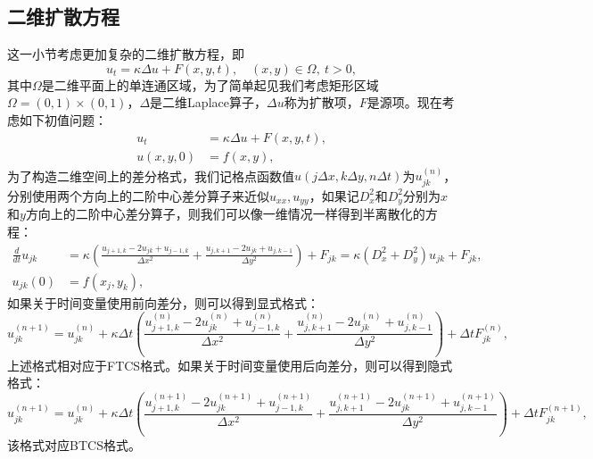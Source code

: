 \documentclass[a4paper,10pt]{ctexart}
\begin{document}
\subsection{二维扩散方程}
这一小节考虑更加复杂的二维扩散方程，即
\begin{equation}
    u_t = \kappa \Delta u + F(x,y,t),\quad (x,y)\in \Omega,\ t>0,
\end{equation}
其中$ \Omega $是二维平面上的单连通区域，为了简单起见我们考虑矩形区域$ \Omega = (0,1)\times (0,1) $，$ \Delta $是二维Laplace算子，$ \Delta u $称为扩散项，$ F $是源项。现在考虑如下初值问题：
\begin{equation}
    \begin{aligned}
        u_t &= \kappa \Delta u + F(x,y,t),\\
        u(x,y,0) &= f(x,y),
    \end{aligned}
\end{equation}
为了构造二维空间上的差分格式，我们记格点函数值$ u(j \Delta x, k \Delta y, n \Delta t) $为$ u^{(n)}_{jk} $，分别使用两个方向上的二阶中心差分算子来近似$ u_{xx}, u_{yy} $，如果记$ D_x^2 $和$ D_y^2 $分别为$ x $和$ y $方向上的二阶中心差分算子，则我们可以像一维情况一样得到半离散化的方程：
\begin{equation}
    \begin{aligned}
        \frac{d}{dt}u_{jk} &= \kappa \left( \frac{u_{j+1,k}-2u_{jk}+u_{j-1,k}}{\Delta x^2} + \frac{u_{j,k+1}-2u_{jk}+u_{j,k-1}}{\Delta y^2} \right) + F_{jk} = \kappa(D_x^2+D_y^2)u_{jk}+F_{jk},\\
        u_{jk}(0) &= f(x_j,y_k),
    \end{aligned}
\end{equation}
如果关于时间变量使用前向差分，则可以得到显式格式：
\begin{equation}
    u^{(n+1)}_{jk} = u^{(n)}_{jk} + \kappa \Delta t \left( \frac{u^{(n)}_{j+1,k}-2u^{(n)}_{jk}+u^{(n)}_{j-1,k}}{\Delta x^2} + \frac{u^{(n)}_{j,k+1}-2u^{(n)}_{jk}+u^{(n)}_{j,k-1}}{\Delta y^2} \right) + \Delta t F_{jk}^{(n)},
\end{equation}
上述格式相对应于FTCS格式。如果关于时间变量使用后向差分，则可以得到隐式格式：
\begin{equation}
    u^{(n+1)}_{jk} = u^{(n)}_{jk} + \kappa \Delta t \left( \frac{u^{(n+1)}_{j+1,k}-2u^{(n+1)}_{jk}+u^{(n+1)}_{j-1,k}}{\Delta x^2} + \frac{u^{(n+1)}_{j,k+1}-2u^{(n+1)}_{jk}+u^{(n+1)}_{j,k-1}}{\Delta y^2} \right) + \Delta t F_{jk}^{(n+1)},
\end{equation}
该格式对应BTCS格式。
\end{document}
